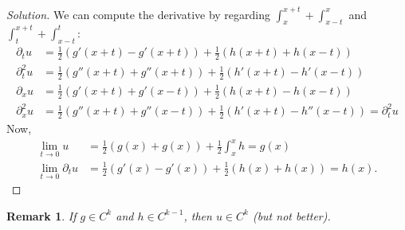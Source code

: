 \documentclass{report}
\theoremstyle{tommy}
\newtheorem{rem}[defn]{Remark}
\begin{document}
	\begin{proof}[Solution]
    We can compute the derivative by regarding \(\int_x^{x+t} + \int_{x-t}^x\) and \(\int_t^{x+t} + \int_{x-t}^t\):
    \begin{align*}
      \partial_t u &= \frac{1}{2} \left(g'(x+t) - g'(x+t)\right) + \frac{1}{2} \left(h(x+t) + h(x-t)\right) \\
      \partial^2_t u &= \frac{1}{2} \left(g''(x+t) + g''(x+t)\right) + \frac{1}{2} \left(h'(x+t) - h'(x-t)\right) \\
      \partial_x u &= \frac{1}{2} \left(g'(x+t)+g'(x-t)\right) + \frac{1}{2} \left(h(x+t)-h(x-t)\right) \\
      \partial^2_x u &= \frac{1}{2} \left(g''(x+t)+g''(x-t)\right) + \frac{1}{2} \left(h'(x+t)-h''(x-t)\right) = \partial_t^2 u
    \end{align*}
    Now,
    \begin{align*}
      \lim_{t \to 0} u &= \frac{1}{2} \left(g(x) + g(x)\right) + \frac{1}{2} \int_x^x h = g(x) \\
      \lim_{t \to 0} \partial_t u &= \frac{1}{2}\left(g'(x) - g'(x)\right)+ \frac{1}{2} \left(h(x) + h(x)\right) = h(x).
    \end{align*}
	\end{proof}

	\begin{rem}
		If \(g \in C^k\) and \(h \in C^{k-1}\), then \(u \in C^k\) (but not better).
	\end{rem}
\end{document}

